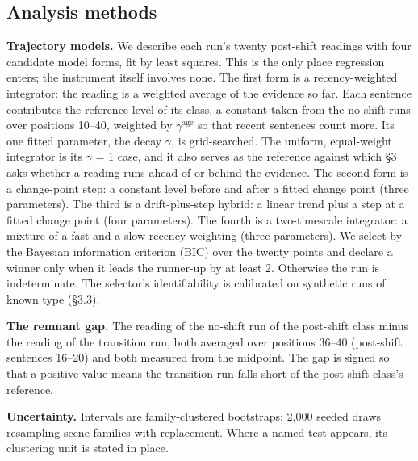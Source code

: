 \documentclass[11pt]{article}
\begin{document}
\subsection{Analysis methods}

\textbf{Trajectory models.} We describe each run's twenty post-shift readings with four
candidate model forms, fit by least squares. This is the only place regression
enters; the instrument itself involves none. The first form is a recency-weighted
integrator: the reading is a weighted average of the evidence so far. Each sentence
contributes the reference level of its class, a constant taken from the no-shift
runs over positions 10–40, weighted by $\gamma^{\mathrm{age}}$ so that recent sentences count more. Its one fitted parameter, the decay $\gamma$, is
grid-searched. The uniform, equal-weight integrator is its $\gamma$ = 1 case, and it also
serves as the reference against which \S3 asks whether a reading runs ahead of or
behind the evidence. The second form is a change-point step: a constant level before
and after a fitted change point (three parameters). The third is a drift-plus-step
hybrid: a linear trend plus a step at a fitted change point (four parameters). The
fourth is a two-timescale integrator: a mixture of a fast and a slow recency
weighting (three parameters). We select by the Bayesian information criterion (BIC) \citep{schwarz1978} over the
twenty points and declare a winner only when it leads the runner-up by at least 2. Otherwise the run is
indeterminate. The selector's identifiability is calibrated on synthetic runs of
known type (\S3.3).

\textbf{The remnant gap.} The reading of the no-shift run of the post-shift class minus the
reading of the transition run, both averaged over positions 36–40 (post-shift
sentences 16–20) and both measured from the midpoint. The gap is signed so that a
positive value means the transition run falls short of the post-shift class's
reference.

\textbf{Uncertainty.} Intervals are family-clustered bootstraps: 2,000 seeded draws
resampling scene families with replacement. Where a named test appears, its clustering
unit is stated in place.
\end{document}
